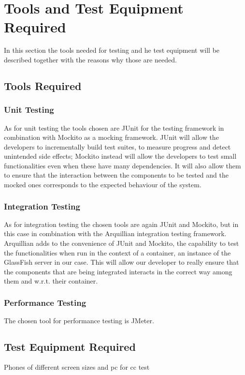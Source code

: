 \section{Tools and Test Equipment Required}

In this section the tools needed for testing and he test equipment will be described together with the reasons why those are needed.

\subsection{Tools Required}

\subsubsection{Unit Testing}
As for unit testing the tools chosen are JUnit for the testing framework in combination with Mockito as a mocking framework.
JUnit will allow the developers to incrementally build test suites, to measure progress and detect unintended side effects; Mockito instead will allow the developers to test small functionalities even when these have many dependencies. It will also allow them to ensure that the interaction between the components to be tested and the mocked ones corresponds to the expected behaviour of the system.

\subsubsection{Integration Testing}
As for integration testing the chosen tools are again JUnit and Mockito, but in this case in combination with the Arquillian integration testing framework.
Arquillian adds to the convenience of JUnit and Mockito, the capability to test the functionalities when run in the context of a container, an instance of the GlassFish server in our case. This will allow our developer to really ensure that the components that are being integrated interacts in the correct way among them and w.r.t. their container.

\subsubsection{Performance Testing}
The chosen tool for performance testing is JMeter.

\subsection{Test Equipment Required}
Phones of different screen sizes and pc for cc test
